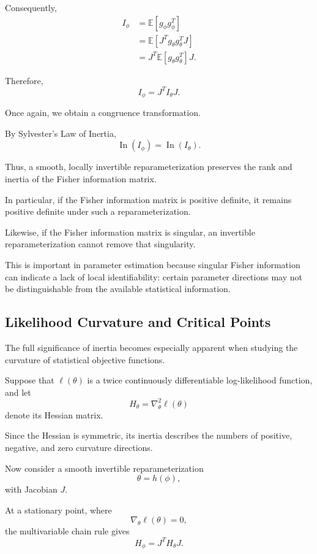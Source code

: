\documentclass[11pt]{article}
\theoremstyle{definition}
\theoremstyle{remark}
\begin{document}
Consequently,
\[
\begin{aligned}
    I_\phi
    &=\mathbb{E}[g_\phi g_\phi^T]\\
    &=\mathbb{E}[J^Tg_\theta g_\theta^TJ]\\
    &=J^T\mathbb{E}[g_\theta g_\theta^T]J.
\end{aligned}
\]

Therefore,
\[
    \boxed{I_\phi=J^TI_\theta J}.
\]

Once again, we obtain a congruence
transformation.

By Sylvester's Law of Inertia,
\[
    \boxed{
    \operatorname{In}(I_\phi)
    =\operatorname{In}(I_\theta).
    }
\]

Thus, a smooth, locally invertible
reparameterization preserves the rank
and inertia of the Fisher information matrix.

In particular, if the Fisher information
matrix is positive definite, it remains
positive definite under such a
reparameterization.

Likewise, if the Fisher information matrix
is singular, an invertible reparameterization
cannot remove that singularity.

This is important in parameter estimation
because singular Fisher information can
indicate a lack of local identifiability:
certain parameter directions may not be
distinguishable from the available
statistical information.


\subsection{Likelihood Curvature and Critical Points}

The full significance of inertia becomes
especially apparent when studying the
curvature of statistical objective functions.

Suppose that $\ell(\theta)$ is a twice
continuously differentiable log-likelihood
function, and let
\[
    H_\theta
    =\nabla_\theta^2\ell(\theta)
\]
denote its Hessian matrix.

Since the Hessian is symmetric, its inertia
describes the numbers of positive, negative,
and zero curvature directions.

Now consider a smooth invertible
reparameterization
\[
    \theta=h(\phi),
\]
with Jacobian $J$.

At a stationary point, where
\[
    \nabla_\theta\ell(\theta)=0,
\]
the multivariable chain rule gives
\[
    \boxed{
    H_\phi=J^TH_\theta J.
    }
\]
\end{document}

